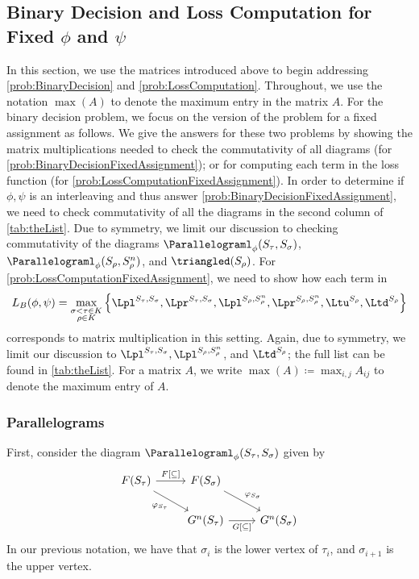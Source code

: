 %
\subsection[]{Binary Decision and Loss Computation for Fixed $\phi$ and $\psi$}

%

%

In this section, we use the matrices introduced above to begin addressing \cref{prob:BinaryDecision} and \cref{prob:LossComputation}. 
Throughout, we use the notation $\max(A)$ to denote the maximum entry in the matrix $A$.
For the binary decision problem, we focus on the version of the problem for a fixed assignment as follows.
We give the answers for these two problems by showing the matrix multiplications needed to check the commutativity of all diagrams (for \cref{prob:BinaryDecisionFixedAssignment}); or for computing each term in the loss function (for \cref{prob:LossComputationFixedAssignment}). 
In order to determine if $\phi,\psi$ is an interleaving and thus answer \cref{prob:BinaryDecisionFixedAssignment}, we need to check commutativity of all the diagrams in the second column of \cref{tab:theList}. 
Due to symmetry, we limit our discussion to checking commutativity of the diagrams  $\Parallelograml_\phi(S_\tau,S_\sigma)$, $\Parallelograml_\phi(S_\rho,S_\rho^n)$, and $\triangled(S_\rho)$. 
For \cref{prob:LossComputationFixedAssignment}, we need to show how  each term in   
\begin{equation*}
L_B(\phi,\psi) = \max_{ \substack{\sigma < \tau \in K \\ \rho \in K}}
\left\{
\Lpl^{S_\tau, S_\sigma}, \Lpr^{S_\tau, S_\sigma},
\Lpl^{S_\rho, S_\rho^n}, \Lpr^{S_\rho, S_\rho^n},
\Ltu^{S_\rho}, \Ltd^{S_\rho}
\right\}
\end{equation*}
corresponds to matrix multiplication in this setting.
Again, due to symmetry, we limit our discussion to $\Lpl^{S_\tau, S_\sigma}, \Lpl^{S_\rho, S_\rho^n}$, and $\Ltd^{S_\rho}$; the full list can be found in \cref{tab:theList}.
%
For a matrix $A$, we write $\max(A) \coloneqq \max_{i,j} A_{ij}$  to denote the maximum entry of $A$.


%
%
%
%
%
%
%
%
%
%

%
\subsubsection{Parallelograms}
 First, consider the diagram $\Parallelograml_\phi(S_\tau,S_\sigma)$ given by 
  \begin{equation*}
    \begin{tikzcd}
    F(S_{\tau})  
        \ar[r, "{F[\subseteq ]}"] 
        \ar[dr, "\varphi_{S_\tau}"']
    & F(S_\sigma)
        \ar[dr, "\varphi_{ S_\sigma}"]
    & \\
    & G^n(S_\tau) 
        \ar[r, "{G[\subseteq ]}"'] 
    & G^n(S_\sigma)  
    \end{tikzcd}
 \end{equation*}
 In our previous notation, we have that $\sigma_i$ is the lower vertex of $\tau_i$, and $\sigma_{i+1}$ is the upper vertex. 
 
